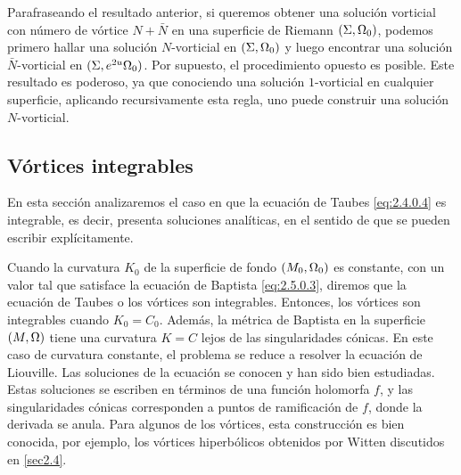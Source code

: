  Parafraseando el resultado anterior, si queremos obtener una solución vorticial con número de vórtice $N+\bar N$ en una superficie de Riemann $(\Sigma,\Omega_0)$, podemos primero hallar una solución $N$-vorticial en $(\Sigma,\Omega_0)$ y luego encontrar una solución $\bar N$-vorticial en $(\Sigma,e^{2u}\Omega_0)$. Por supuesto, el procedimiento opuesto es posible. Este resultado es poderoso, ya que conociendo una solución $1$-vorticial en cualquier superficie, aplicando recursivamente esta regla, uno puede construir una solución $N$-vorticial.
 
 \subsection{Vórtices integrables} \label{sec:2.5.1}
 En esta sección analizaremos el caso en que la ecuación de Taubes \eqref{eq:2.4.0.4} es integrable, es decir, presenta soluciones analíticas, en el sentido de que se pueden escribir explícitamente. 
 
 Cuando la curvatura $K_0$ de la superficie de fondo $(M_0,\Omega_0)$ es constante, con un valor tal que satisface la ecuación de Baptista \eqref{eq:2.5.0.3}, diremos que la ecuación de Taubes o los vórtices son integrables. Entonces, los vórtices son integrables cuando $K_0=C_0$. Además, la métrica de Baptista en la superficie $(M,\Omega)$ tiene una curvatura $K=C$ lejos de las singularidades cónicas. En este caso de curvatura constante, el problema se reduce a resolver la ecuación de Liouville. Las soluciones de la ecuación se conocen y han sido bien estudiadas. Estas soluciones se escriben en términos de una función holomorfa $f$, y las singularidades cónicas corresponden a puntos de ramificación de $f$, donde la derivada se anula. Para algunos de los vórtices, esta construcción es bien conocida, por ejemplo, los vórtices hiperbólicos obtenidos por Witten discutidos en \ref{sec2.4}.
 

